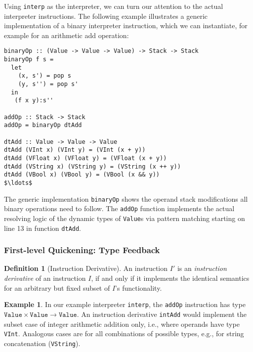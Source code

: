 \documentclass[preprint,10pt]{popl14conf}
\begin{document}
Using \texttt{interp} as the interpreter, we can turn our attention to the actual interpreter
instructions.
The following example illustrates a generic implementation of a binary interpreter instruction,
which we can instantiate, for example for an arithmetic add operation:

\begin{lstlisting}[style=prettyhaskell]
binaryOp :: (Value -> Value -> Value) -> Stack -> Stack
binaryOp f s =
  let
    (x, s') = pop s
    (y, s'') = pop s'
  in
   (f x y):s''

addOp :: Stack -> Stack
addOp = binaryOp dtAdd

dtAdd :: Value -> Value -> Value
dtAdd (VInt x) (VInt y) = (VInt (x + y))
dtAdd (VFloat x) (VFloat y) = (VFloat (x + y))
dtAdd (VString x) (VString y) = (VString (x ++ y))
dtAdd (VBool x) (VBool y) = (VBool (x && y))
$\ldots$
\end{lstlisting}

The generic implementation \texttt{binaryOp} shows the operand stack modifications all binary
operations need to follow.
The \texttt{addOp} function implements the actual resolving logic of the dynamic types of
\texttt{Value}s via pattern matching starting on line 13 in function \texttt{dtAdd}.

\subsubsection{First-level Quickening: Type Feedback}

\theoremstyle{definition}
\newtheorem{defn}{Definition}
\newtheorem{exmp}{Example}

\begin{defn}[Instruction Derivative]
  An instruction $I'$ is an \emph{instruction derivative} of an instruction $I$, if and only if it
  implements the identical semantics for an arbitrary but fixed subset of $I$'s functionality.
\end{defn}


\begin{exmp}
  In our example interpreter \texttt{interp}, the \texttt{addOp} instruction has type
  $\mathtt{Value} \times \mathtt{Value} \rightarrow \mathtt{Value}$.
  An instruction derivative \texttt{intAdd} would implement the subset case of integer arithmetic
  addition only, i.e., where operands have type \texttt{VInt}.
  Analogous cases are for all combinations of possible types, e.g., for string concatenation
  (\texttt{VString}).
\end{exmp}
\end{document}
